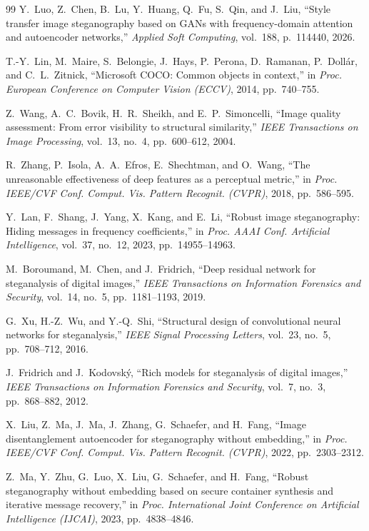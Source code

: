 \documentclass[conference]{IEEEtran}
\begin{document}
\begin{thebibliography}{99}
Y.\ Luo, Z.\ Chen, B.\ Lu, Y.\ Huang, Q.\ Fu, S.\ Qin, and J.\ Liu, ``Style transfer image steganography based on GANs with frequency-domain attention and autoencoder networks,'' \emph{Applied Soft Computing}, vol.\ 188, p.\ 114440, 2026.

T.-Y.\ Lin, M.\ Maire, S.\ Belongie, J.\ Hays, P.\ Perona, D.\ Ramanan, P.\ Doll\'ar, and C.~L.\ Zitnick, ``Microsoft COCO: Common objects in context,'' in \emph{Proc. European Conference on Computer Vision (ECCV)}, 2014, pp.\ 740--755.

Z.\ Wang, A.~C.\ Bovik, H.~R.\ Sheikh, and E.~P.\ Simoncelli, ``Image quality assessment: From error visibility to structural similarity,'' \emph{IEEE Transactions on Image Processing}, vol.\ 13, no.\ 4, pp.\ 600--612, 2004.

R.\ Zhang, P.\ Isola, A.~A.\ Efros, E.\ Shechtman, and O.\ Wang, ``The unreasonable effectiveness of deep features as a perceptual metric,'' in \emph{Proc. IEEE/CVF Conf. Comput. Vis. Pattern Recognit. (CVPR)}, 2018, pp.\ 586--595.

Y.\ Lan, F.\ Shang, J.\ Yang, X.\ Kang, and E.\ Li, ``Robust image steganography: Hiding messages in frequency coefficients,'' in \emph{Proc. AAAI Conf. Artificial Intelligence}, vol.\ 37, no.\ 12, 2023, pp.\ 14955--14963.

M.\ Boroumand, M.\ Chen, and J.\ Fridrich, ``Deep residual network for steganalysis of digital images,'' \emph{IEEE Transactions on Information Forensics and Security}, vol.\ 14, no.\ 5, pp.\ 1181--1193, 2019.

G.\ Xu, H.-Z.\ Wu, and Y.-Q.\ Shi, ``Structural design of convolutional neural networks for steganalysis,'' \emph{IEEE Signal Processing Letters}, vol.\ 23, no.\ 5, pp.\ 708--712, 2016.

J.\ Fridrich and J.\ Kodovsk\'y, ``Rich models for steganalysis of digital images,'' \emph{IEEE Transactions on Information Forensics and Security}, vol.\ 7, no.\ 3, pp.\ 868--882, 2012.

X.\ Liu, Z.\ Ma, J.\ Ma, J.\ Zhang, G.\ Schaefer, and H.\ Fang, ``Image disentanglement autoencoder for steganography without embedding,'' in \emph{Proc. IEEE/CVF Conf. Comput. Vis. Pattern Recognit. (CVPR)}, 2022, pp.\ 2303--2312.

Z.\ Ma, Y.\ Zhu, G.\ Luo, X.\ Liu, G.\ Schaefer, and H.\ Fang, ``Robust steganography without embedding based on secure container synthesis and iterative message recovery,'' in \emph{Proc. International Joint Conference on Artificial Intelligence (IJCAI)}, 2023, pp.\ 4838--4846.


\end{thebibliography}
\end{document}
